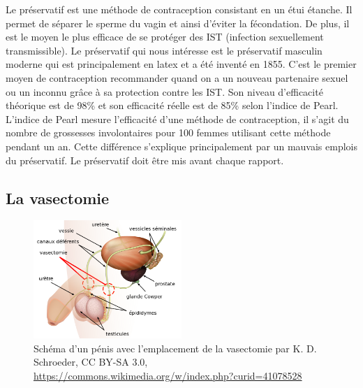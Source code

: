 \documentclass[12pt,a4paper]{report}
\begin{document}
Le préservatif est une méthode de contraception consistant en un étui étanche. Il permet de séparer le sperme du vagin et ainsi d'éviter la fécondation. \cite{PreservatifWikipedia}
De plus, il est le moyen le plus efficace de se protéger des IST (infection sexuellement transmissible). \cite{MaladiesInfectionsSexuellement}
Le préservatif qui nous intéresse est le préservatif masculin moderne qui est principalement en latex et a été inventé en 1855. \cite{PreservatifWikipedia}
C'est le premier moyen de contraception recommander quand on a un nouveau partenaire sexuel ou un inconnu grâce à sa protection contre les IST. \cite{PreventionIST}
Son niveau d'efficacité théorique est de 98\% et son efficacité réelle est de 85\% selon l'indice de Pearl. L'indice de Pearl mesure l'efficacité d'une méthode de contraception, il s'agit du nombre de grossesses involontaires pour 100 femmes utilisant cette méthode pendant un an.\cite{EfficaciteMoyensContraceptifs}
Cette différence s'explique principalement par un mauvais emplois du préservatif.
Le préservatif doit être mis avant chaque rapport. \cite{TousMoyensContraception2023} 

\subsection{La vasectomie}

\begin{figure}[h]
    \centering
    \includegraphics[width=0.5\textwidth]{images/scientiphique/Vasectomie_fr.svg.png}
    \caption{Schéma d'un pénis avec l'emplacement de la vasectomie par K. D. Schroeder, CC BY-SA 3.0, \href{https://commons.wikimedia.org/w/index.php?curid=41078528}{https://commons.wikimedia.org/w/index.php?curid=41078528}}
    \label{fig:vasectomie}
\end{figure}
\end{document}
